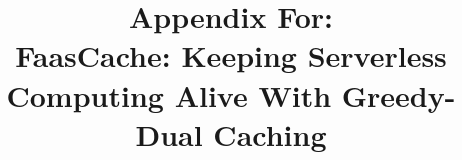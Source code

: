 \documentclass[pageno]{jpaper}
\begin{document}

\title{Appendix For:\\ FaasCache: Keeping Serverless Computing Alive With Greedy-Dual Caching}



\date{}

\author{}

\maketitle 

\thispagestyle{empty}


\end{document}
